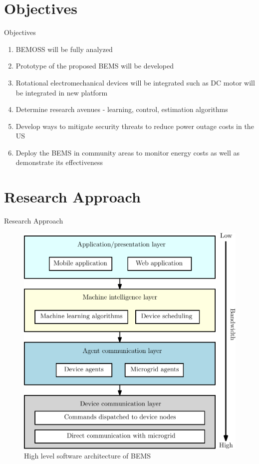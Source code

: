 \documentclass{beamer}
\begin{document}
\section{Objectives}
\begin{frame}{Objectives}
\begin{enumerate}
\item BEMOSS will be fully analyzed 
\item Prototype of the proposed BEMS will be developed
\item Rotational electromechanical devices will be integrated such as DC motor will be integrated in new platform
\item Determine research avenues - learning, control, estimation algorithms
\item Develop ways to mitigate security threats to reduce power outage costs in the US
\item Deploy the BEMS in community areas to monitor energy costs as well as demonstrate its effectiveness
\end{enumerate}
\end{frame}

\section{Research Approach}
\begin{frame}{Research Approach}
\begin{figure}
\includegraphics[scale=0.35]{../figs/ipe/BEMS-softwareArchitecture}
\caption{High level software architecture of BEMS}
\end{figure}
\end{frame}
\end{document}
